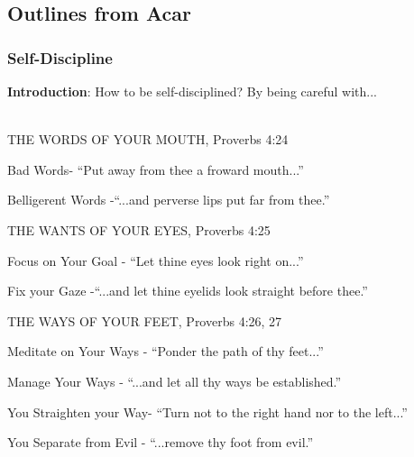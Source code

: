 \subsection{Outlines from Acar}


\subsubsection{Self-Discipline}
\textbf{Introduction}: How to be self-disciplined?  By being careful with...\\
\\
\begin{compactenum}[I.][4]
	\item THE WORDS OF YOUR MOUTH, Proverbs 4:24 
	\begin{compactenum}[A.]
		\item Bad Words- “Put away from thee a froward mouth...”
		\item Belligerent Words -“...and perverse lips put far from thee.”
	\end{compactenum}
	\item THE WANTS OF YOUR EYES, Proverbs 4:25 
	\begin{compactenum}[A.]
		\item Focus on Your Goal - “Let thine eyes look right on...”
		\item Fix your Gaze -“...and let thine eyelids look straight before thee.”
	\end{compactenum}
	\item THE WAYS OF YOUR FEET, Proverbs 4:26, 27
	\begin{compactenum}[A.]
		\item Meditate on Your Ways - “Ponder the path of thy feet...”
		\item Manage Your Ways  - “...and let all thy ways be established.”
		\begin{compactenum}[1.]
			\item You Straighten your Way- “Turn not to the right hand nor to the left...”
			\item You Separate from Evil  - “...remove thy foot from evil.”
		\end{compactenum}
	\end{compactenum}
\end{compactenum}

